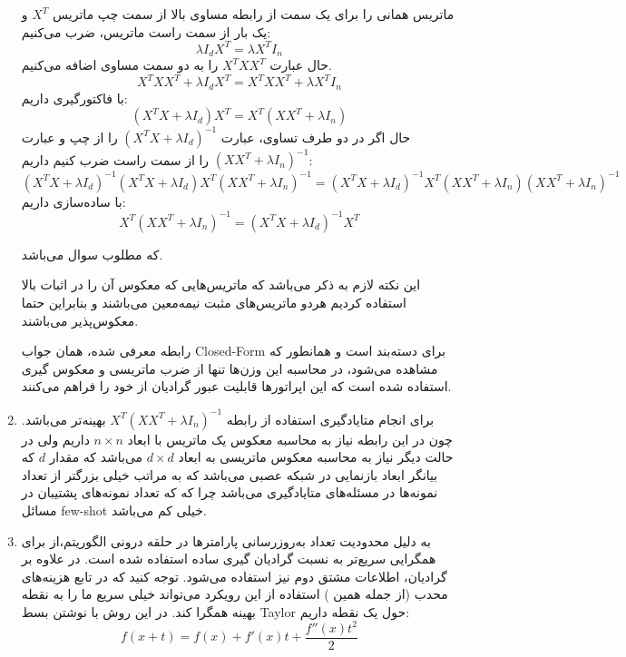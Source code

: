 \documentclass{article}
\begin{document}
\begin{enumerate}
	ماتریس همانی را برای یک سمت از رابطه مساوی بالا از سمت چپ ماتریس 
	${X^T}$
	و یک بار از سمت راست ماتریس،‌ ضرب می‌کنیم:
	$$
	\lambda {I_d}{X^T} = \lambda {X^T}{I_n}
	$$
	حال عبارت
	${X^T}X{X^T}$
	را به دو سمت مساوی اضافه می‌کنیم.
	$$
	{X^T}X{X^T} + \lambda {I_d}{X^T} = {X^T}X{X^T} + \lambda {X^T}{I_n}
	$$
	با فاکتورگیری داریم:
	$$
	\left( {{X^T}X + \lambda {I_d}} \right){X^T} = {X^T}\left( {X{X^T} + \lambda {I_n}} \right)
	$$
	حال اگر در دو طرف تساوی، عبارت
	${\left( {{X^T}X + \lambda {I_d}} \right)^{ - 1}}$
	را از چپ و عبارت
	${\left( {X{X^T} + \lambda {I_n}} \right)^{ - 1}}$
	را از سمت راست ضرب کنیم داریم:
	$$
	{\left( {{X^T}X + \lambda {I_d}} \right)^{ - 1}}\left( {{X^T}X + \lambda {I_d}} \right){X^T}{\left( {X{X^T} + \lambda {I_n}} \right)^{ - 1}} = {\left( {{X^T}X + \lambda {I_d}} \right)^{ - 1}}{X^T}\left( {X{X^T} + \lambda {I_n}} \right){\left( {X{X^T} + \lambda {I_n}} \right)^{ - 1}}
	$$
	با ساده‌سازی داریم:
	$$
	{X^T}{\left( {X{X^T} + \lambda {I_n}} \right)^{ - 1}} = {\left( {{X^T}X + \lambda {I_d}} \right)^{ - 1}}{X^T}
	$$
	
	که مطلوب سوال می‌باشد. 
	
		این نکته لازم به ذکر می‌باشد که ماتریس‌هایی که معکوس آن را در اثبات بالا استفاده کردیم هردو ماتریس‌های مثبت نیمه‌معین می‌باشند و بنابراین حتما معکوس‌پذیر می‌باشند.
	
	رابطه معرفی شده، همان جواب Closed-Form برای دسته‌بند 
	است و همانطور که مشاهده می‌شود، در محاسبه این وزن‌ها تنها از ضرب ماتریسی و معکوس گیری استفاده شده است که این‌ اپراتورها قابلیت عبور گرادیان از خود را فراهم می‌کنند.
	
\item
	
	برای انجام متایادگیری استفاده از رابطه
	${X^T}{\left( {X{X^T} + \lambda {I_n}} \right)^{ - 1}}$
	بهینه‌تر می‌باشد. چون در این رابطه نیاز به محاسبه معکوس یک ماتریس با ابعاد
	$n \times n$
	داریم ولی در حالت دیگر نیاز به محاسبه معکوس ماتریسی به ابعاد
	$d \times d$
	می‌باشد که مقدار $d$ که بیانگر ابعاد بازنمایی در شبکه عصبی می‌باشد که به مراتب خیلی بزرگتر از تعداد نمونه‌ها در مسئله‌های متایادگیری می‌باشد چرا که که تعداد نمونه‌های پشتیبان در مسائل few-shot خیلی کم می‌باشد.
	
	\item
	به دلیل محدودیت تعداد به‌روزرسانی پارامترها در حلقه درونی الگوریتم،‌از
	برای همگرایی سریع‌تر به نسبت گرادیان گیری ساده استفاده شده است.
	در
	علاوه بر گرادیان،‌ اطلاعات مشتق دوم نیز استفاده می‌شود. توجه کنید که در تابع هزینه‌های محدب (از جمله همین 
	)
	استفاده از این رویکرد می‌تواند خیلی سریع ما را به نقطه بهینه همگرا کند.
	در این روش با نوشتن بسط Taylor حول یک نقطه داریم:
	$$
	f\left( {x + t} \right) = f\left( x \right) + f'\left( x \right)t + \frac{{f''\left( x \right){t^2}}}{2}
	$$
	

\end{enumerate}
\end{document}
